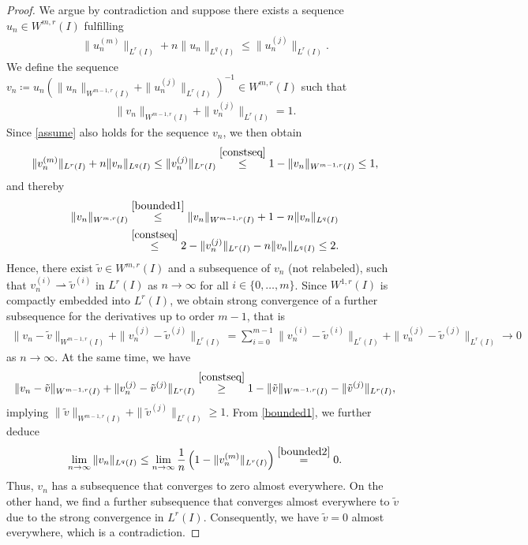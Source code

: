 \documentclass{article}
\newcommand{\tilv}{\tilde{v}}
\numberwithin{figure}{section}
\numberwithin{equation}{section}
\begin{document}
\begin{proof}
We argue by contradiction and suppose there exists a sequence $u_n \in W^{m,r}(I)$ fulfilling
    \begin{align} \label{assume}
        \|u_n^{(m)}\|_{L^r(I)} + n\|u_n\|_{L^q(I)} \leq \|u_n^{(j)}\|_{L^r(I)}.
    \end{align}
We define the sequence $v_n \coloneq u_n \left(\|u_n\|_{W^{m-1,r}(I)}+\|u_n^{(j)}\|_{L^r(I)}\right)^{-1} \in W^{m,r}(I)$ such that
\begin{align} \label{constseq}
    \|v_n\|_{W^{m-1,r}(I)}+\|v_n^{(j)}\|_{L^r(I)}=1.
\end{align}
Since \eqref{assume} also holds for the sequence $v_n$, we then obtain
\begin{align} \label{bounded1}
    \|v_n^{(m)}\|_{L^r(I)}+n\|v_n\|_{L^q(I)} 
    \leq \|v_n^{(j)}\|_{L^r(I)}
    \overset{\eqref{constseq}}{\leq} 1-\|v_n\|_{W^{m-1,r}(I)} \leq 1,
\end{align}
and thereby
\begin{align} \label{bounded2}
\begin{split}
    \|v_n\|_{W^{m,r}(I)} & \overset{\eqref{bounded1}}{\leq}  \|v_n\|_{W^{m-1,r}(I)} +1 - n \|v_n\|_{L^q(I)}\\
    &\overset{\eqref{constseq}}{\leq} 2- \|v_n^{(j)}\|_{L^r(I)} - n \|v_n\|_{L^q(I)}
    \leq 2.
\end{split}
\end{align}
Hence, there exist $\tilv \in W^{m,r}(I)$ and a subsequence of $v_n$ (not relabeled), such that $v_n^{(i)} \rightharpoonup \tilv^{(i)}$ in $L^r(I)$ as $n \to \infty$ for all $i \in \{0,\ldots , m\}$. Since $W^{1,r}(I)$ is compactly embedded into $L^r(I)$, we obtain strong convergence of a further subsequence for the derivatives up to order $m-1$, that is
\begin{align}
    \|v_n-\tilv \|_{W^{m-1,r}(I)}+ \|v_n^{(j)}- \tilv^{(j)}\|_{L^r(I)} = \sum_{i=0}^{m-1} \|v_n^{(i)}- \tilv^{(i)}\|_{L^r(I)} +\|v_n^{(j)}- \tilv^{(j)}\|_{L^r(I)} \to 0
\end{align}
as $n \to \infty$. At the same time, we have 
\begin{align}
    \|v_n-\tilv \|_{W^{m-1,r}(I)}+ \|v_n^{(j)}- \tilv^{(j)}\|_{L^r(I)} 
    \overset{\eqref{constseq}}{\geq} 1 - \|\tilv \|_{W^{m-1,r}(I)} - \|\tilv^{(j)}\|_{L^r(I)},
\end{align}
implying $\|\tilv \|_{W^{m-1,r}(I)} + \|\tilv^{(j)}\|_{L^r(I)} \geq 1$.
From \eqref{bounded1}, we further deduce
\begin{align}
    \lim_{n\to \infty} \|v_n\|_{L^q(I)} \leq \lim_{n \to \infty} \frac 1n \left(1-\|v_n^{(m)}\|_{L^r(I)}\right) \overset{\eqref{bounded2}}{=} 0.
\end{align}
Thus, $v_n$ has a subsequence that converges to zero almost everywhere. On the other hand, we find a further subsequence that converges almost everywhere to $\tilv$ due to the strong convergence in $L^r(I)$. Consequently, we have $\tilv = 0$ almost everywhere, which is a contradiction.
\end{proof}
\end{document}
